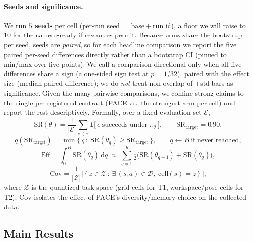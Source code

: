 \documentclass[letterpaper]{article} %
\begin{document}
\paragraph{Seeds and significance.} We run \textbf{$5$ seeds} per cell (per-run seed
$=\text{base}+\text{run\_id}$), a floor we will raise to $10$ for the camera-ready if
resources permit. Because arms share the bootstrap per seed, seeds are \emph{paired},
so for each headline comparison we report the five paired per-seed differences
directly rather than a bootstrap CI (pinned to min/max over five points). We call a
comparison directional only when all five differences share a sign (a one-sided sign
test at $p=1/32$), paired with the effect size (median paired difference); we do
\emph{not} treat non-overlap of $\pm$std bars as significance. Given the many pairwise
comparisons, we confine strong claims to the single pre-registered contrast (PACE
vs.\ the strongest arm per cell) and report the rest descriptively. Formally, over a
fixed evaluation set $\mathcal{E}$,
\begin{equation}
\mathrm{SR}(\theta)=\frac{1}{|\mathcal{E}|}\sum_{e\in\mathcal{E}}\mathbf{1}\big[\ e\ \text{succeeds under }\pi_\theta\ \big],
\qquad \mathrm{SR}_{\mathrm{target}}=0.90,
\label{eq:sr}
\end{equation}
\begin{equation}
q(\mathrm{SR}_{\mathrm{target}})=\min\big\{\,q\ :\ \mathrm{SR}(\theta_q)\ge\mathrm{SR}_{\mathrm{target}}\,\big\},
\qquad q\leftarrow B\ \text{if never reached},
\label{eq:queries}
\end{equation}
\begin{equation}
\mathrm{Eff}=\int_{0}^{B}\mathrm{SR}(\theta_{q})\ \mathrm{d}q
\ \approx\ \sum_{q=1}^{B}\tfrac12\big(\mathrm{SR}(\theta_{q-1})+\mathrm{SR}(\theta_{q})\big),
\label{eq:eff}
\end{equation}
\begin{equation}
\mathrm{Cov}=\frac{1}{|\mathcal{Z}|}\Big|\ \big\{\,z\in\mathcal{Z}\ :\ \exists\,(s,a)\in\mathcal{D},\ \mathrm{cell}(s)=z\,\big\}\ \Big|,
\label{eq:cov}
\end{equation}
where $\mathcal{Z}$ is the quantized task space (grid cells for T1, workspace/pose
cells for T2); $\mathrm{Cov}$ isolates the effect of PACE's diversity/memory
choice on the collected data.

\subsection{Main Results}
\end{document}
